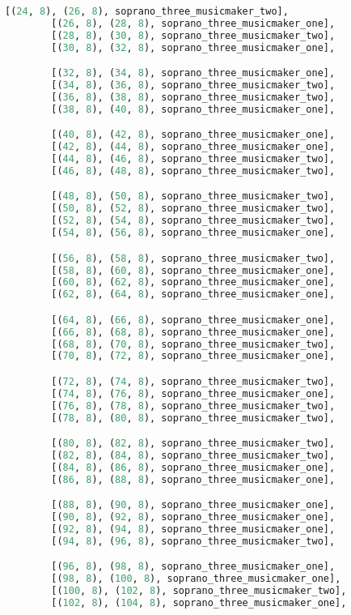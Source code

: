\begin{lstlisting}[language=Python, caption=Invocation Source Code]
        [(24, 8), (26, 8), soprano_three_musicmaker_two],
        [(26, 8), (28, 8), soprano_three_musicmaker_one],
        [(28, 8), (30, 8), soprano_three_musicmaker_two],
        [(30, 8), (32, 8), soprano_three_musicmaker_one],

        [(32, 8), (34, 8), soprano_three_musicmaker_one],
        [(34, 8), (36, 8), soprano_three_musicmaker_two],
        [(36, 8), (38, 8), soprano_three_musicmaker_two],
        [(38, 8), (40, 8), soprano_three_musicmaker_one],

        [(40, 8), (42, 8), soprano_three_musicmaker_one],
        [(42, 8), (44, 8), soprano_three_musicmaker_one],
        [(44, 8), (46, 8), soprano_three_musicmaker_two],
        [(46, 8), (48, 8), soprano_three_musicmaker_two],

        [(48, 8), (50, 8), soprano_three_musicmaker_two],
        [(50, 8), (52, 8), soprano_three_musicmaker_two],
        [(52, 8), (54, 8), soprano_three_musicmaker_two],
        [(54, 8), (56, 8), soprano_three_musicmaker_one],

        [(56, 8), (58, 8), soprano_three_musicmaker_two],
        [(58, 8), (60, 8), soprano_three_musicmaker_one],
        [(60, 8), (62, 8), soprano_three_musicmaker_one],
        [(62, 8), (64, 8), soprano_three_musicmaker_one],

        [(64, 8), (66, 8), soprano_three_musicmaker_one],
        [(66, 8), (68, 8), soprano_three_musicmaker_one],
        [(68, 8), (70, 8), soprano_three_musicmaker_two],
        [(70, 8), (72, 8), soprano_three_musicmaker_one],

        [(72, 8), (74, 8), soprano_three_musicmaker_two],
        [(74, 8), (76, 8), soprano_three_musicmaker_one],
        [(76, 8), (78, 8), soprano_three_musicmaker_two],
        [(78, 8), (80, 8), soprano_three_musicmaker_two],

        [(80, 8), (82, 8), soprano_three_musicmaker_two],
        [(82, 8), (84, 8), soprano_three_musicmaker_two],
        [(84, 8), (86, 8), soprano_three_musicmaker_one],
        [(86, 8), (88, 8), soprano_three_musicmaker_one],

        [(88, 8), (90, 8), soprano_three_musicmaker_one],
        [(90, 8), (92, 8), soprano_three_musicmaker_one],
        [(92, 8), (94, 8), soprano_three_musicmaker_one],
        [(94, 8), (96, 8), soprano_three_musicmaker_two],

        [(96, 8), (98, 8), soprano_three_musicmaker_one],
        [(98, 8), (100, 8), soprano_three_musicmaker_one],
        [(100, 8), (102, 8), soprano_three_musicmaker_two],
        [(102, 8), (104, 8), soprano_three_musicmaker_one],


\end{lstlisting}
